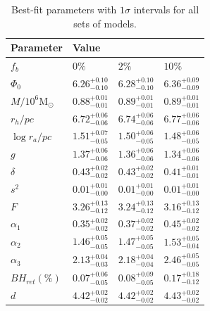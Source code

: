 

\begin{table}
	\centering
\caption{Best-fit parameters with $1\sigma$ intervals for all sets of models.}
	\begin{tabular}{l l l l}

		\hline
		Parameter                 & Value                                                                    \\
		\hline
		$f_b$                     & $0\%$                  & $2\%$                  & $10\%$                 \\
		$\Phi_0$                  & $6.26^{+0.10}_{-0.10}$ & $6.28^{+0.10}_{-0.10}$ & $6.36^{+0.09}_{-0.09}$ \\
		$M/10^6 \mathrm{M}_\odot$ & $0.88^{+0.01}_{-0.01}$ & $0.89^{+0.01}_{-0.01}$ & $0.89^{+0.01}_{-0.01}$ \\
		$r_h / pc$                & $6.72^{+0.06}_{-0.06}$ & $6.74^{+0.06}_{-0.06}$ & $6.77^{+0.06}_{-0.06}$ \\
		$\log{r_a / pc}$          & $1.51^{+0.07}_{-0.05}$ & $1.50^{+0.06}_{-0.05}$ & $1.48^{+0.06}_{-0.05}$ \\
		$g$                       & $1.37^{+0.06}_{-0.06}$ & $1.36^{+0.06}_{-0.06}$ & $1.34^{+0.06}_{-0.06}$ \\
		$\delta$                  & $0.43^{+0.02}_{-0.02}$ & $0.43^{+0.02}_{-0.02}$ & $0.41^{+0.01}_{-0.01}$ \\
		$s^2$                     & $0.01^{+0.01}_{-0.00}$ & $0.01^{+0.01}_{-0.00}$ & $0.01^{+0.01}_{-0.00}$ \\
		$F$                       & $3.26^{+0.13}_{-0.12}$ & $3.24^{+0.13}_{-0.12}$ & $3.16^{+0.13}_{-0.12}$ \\
		$\alpha_1$                & $0.35^{+0.02}_{-0.02}$ & $0.37^{+0.02}_{-0.02}$ & $0.45^{+0.02}_{-0.02}$ \\
		$\alpha_2$                & $1.46^{+0.05}_{-0.05}$ & $1.47^{+0.05}_{-0.05}$ & $1.53^{+0.05}_{-0.04}$ \\
		$\alpha_3$                & $2.13^{+0.04}_{-0.03}$ & $2.18^{+0.04}_{-0.04}$ & $2.46^{+0.05}_{-0.05}$ \\
		$BH_{ret} (\%)$           & $0.07^{+0.06}_{-0.05}$ & $0.08^{+0.09}_{-0.05}$ & $0.17^{+0.18}_{-0.12}$ \\
		$d$                       & $4.42^{+0.02}_{-0.02}$ & $4.42^{+0.02}_{-0.02}$ & $4.43^{+0.02}_{-0.02}$ \\
		\hline
	\end{tabular}
	\label{tab:parameters_all}
\end{table}







